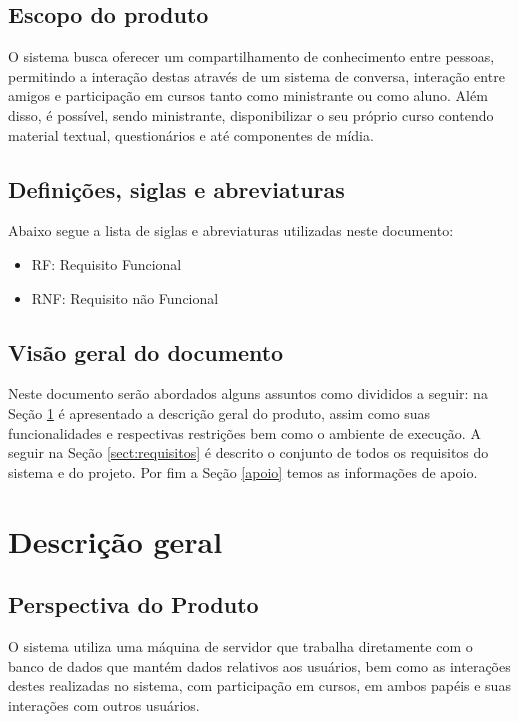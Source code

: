 \documentclass[12pt,a4paper,onecolumn,titlepage]{article}
\begin{document}
\subsection{Escopo do produto}

O sistema busca oferecer um compartilhamento de conhecimento entre pessoas, permitindo a interação destas através de um sistema de conversa, interação entre amigos e participação em cursos tanto como ministrante ou como aluno. Além disso, é possível, sendo ministrante, disponibilizar o seu próprio curso contendo material textual, questionários e até componentes de mídia.

\subsection{Definições, siglas e abreviaturas}

Abaixo segue a lista de siglas e abreviaturas utilizadas neste documento:
\begin{itemize}
\item RF: Requisito Funcional
\item RNF: Requisito não Funcional
\end{itemize}

\subsection{Visão geral do documento}

Neste documento serão abordados alguns assuntos como divididos a seguir: na Seção \ref{sect:descricao} é apresentado a descrição geral do produto, assim como suas funcionalidades e respectivas restrições bem como o ambiente de execução. A seguir na Seção \ref{sect:requisitos} é descrito o conjunto de todos os requisitos do sistema e do projeto. Por fim a Seção \ref{apoio} temos as informações de apoio.

\section{Descrição geral}
\label{sect:descricao}

\subsection{Perspectiva do Produto}

O sistema utiliza uma máquina de servidor que trabalha diretamente com o banco de dados que mantém dados relativos aos usuários, bem como as interações destes realizadas no sistema, com participação em cursos, em ambos papéis e suas interações com outros usuários.
\end{document}
